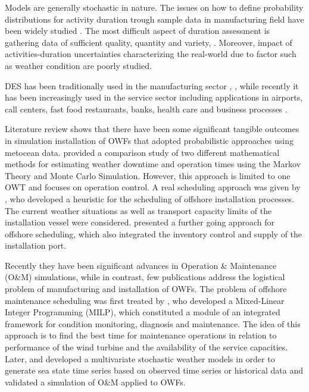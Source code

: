Models are generally stochastic in nature. The issues on how to define probability distributions for activity duration trough sample data in manufacturing field have been widely studied \cite{Fente_2000, Maio2000, EJOR001}. The most difficult aspect of duration assessment is gathering data of sufficient quality, quantity and variety, \cite{Robinson_2014}. Moreover, impact of activities-duration uncertainties characterizing the real-world due to factor such as weather condition are poorly studied.

DES has been traditionally used in the manufacturing sector \cite{KhedriLiraviasl20151490}, \cite{Yeong2014}, while recently it has been increasingly used in the service sector including applications in airports, call centers, fast food restaurants, banks, health care \cite{Chemweno201445,Viana_2014} and business processes \cite{Khodyrev2014322}.

Literature review shows that there have been some significant tangible outcomes in simulation installation of OWFs that adopted probabilistic approaches using metocean data. \cite{Tyapin2011} provided a comparison study of two different mathematical methods for estimating weather downtime and operation times using the Markov Theory and Monte Carlo Simulation. However, this approach is limited to one OWT and focuses on operation control. A real scheduling approach was given by \cite{Scholz2010}, who developed a heuristic for the scheduling of offshore installation processes. The current weather situations as well as transport capacity limits of the installation vessel were considered.   \cite{ISOPE2012} presented a further going approach for offshore scheduling, which also integrated the inventory control and supply of the installation port.

Recently they have been significant advances in Operation \& Maintenance (O\&M) simulations, while in contrast, few publications address the logistical problem of manufacturing and installation of OWFs. The problem of offshore maintenance scheduling was first treated by \cite{Kovacs2011497}, who developed a Mixed-Linear Integer Programming (MILP), which constituted a module of an integrated framework for condition monitoring, diagnosis and maintenance. The idea of this approach is to find the best time for maintenance operations in relation to performance of the wind turbine and the availability of the service capacities. Later, \cite{scheu2012} and \cite{Hagen2013} developed a multivariate stochastic weather models in order to generate sea state time series based on observed time series or historical data and validated a simulation of O\&M applied to OWFs.

